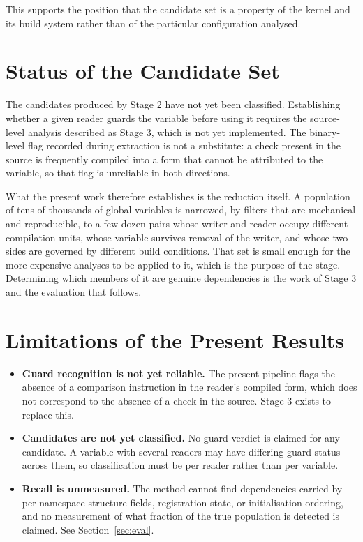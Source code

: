 \documentclass[12pt, a4paper, oneside]{book}
\begin{document}
This supports the position that the candidate set is a property of the kernel and
its build system rather than of the particular configuration analysed.

\section{Status of the Candidate Set}

The candidates produced by Stage 2 have not yet been classified. Establishing
whether a given reader guards the variable before using it requires the
source-level analysis described as Stage 3, which is not yet implemented. The
binary-level flag recorded during extraction is not a substitute: a check present
in the source is frequently compiled into a form that cannot be attributed to the
variable, so that flag is unreliable in both directions.

What the present work therefore establishes is the reduction itself. A population
of tens of thousands of global variables is narrowed, by filters that are
mechanical and reproducible, to a few dozen pairs whose writer and reader occupy
different compilation units, whose variable survives removal of the writer, and
whose two sides are governed by different build conditions. That set is small
enough for the more expensive analyses to be applied to it, which is the purpose
of the stage. Determining which members of it are genuine dependencies is the
work of Stage 3 and the evaluation that follows.

\section{Limitations of the Present Results}

\begin{itemize}[leftmargin=*, itemsep=2pt]
  \item \textbf{Guard recognition is not yet reliable.} The present pipeline
        flags the absence of a comparison instruction in the reader's compiled
        form, which does not correspond to the absence of a check in the source.
        Stage 3 exists to replace this.
  \item \textbf{Candidates are not yet classified.} No guard verdict is claimed
        for any candidate. A variable with several readers may have differing
        guard status across them, so classification must be per reader rather
        than per variable.
  \item \textbf{Recall is unmeasured.} The method cannot find dependencies
        carried by per-namespace structure fields, registration state, or
        initialisation ordering, and no measurement of what fraction of the true
        population is detected is claimed. See Section~\ref{sec:eval}.
\end{itemize}
\end{document}

